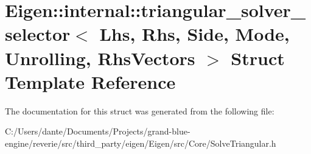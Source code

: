 \hypertarget{struct_eigen_1_1internal_1_1triangular__solver__selector}{}\section{Eigen\+::internal\+::triangular\+\_\+solver\+\_\+selector$<$ Lhs, Rhs, Side, Mode, Unrolling, Rhs\+Vectors $>$ Struct Template Reference}
\label{struct_eigen_1_1internal_1_1triangular__solver__selector}


The documentation for this struct was generated from the following file\+:\begin{DoxyCompactItemize}
\item 
C\+:/\+Users/dante/\+Documents/\+Projects/grand-\/blue-\/engine/reverie/src/third\+\_\+party/eigen/\+Eigen/src/\+Core/Solve\+Triangular.\+h\end{DoxyCompactItemize}
